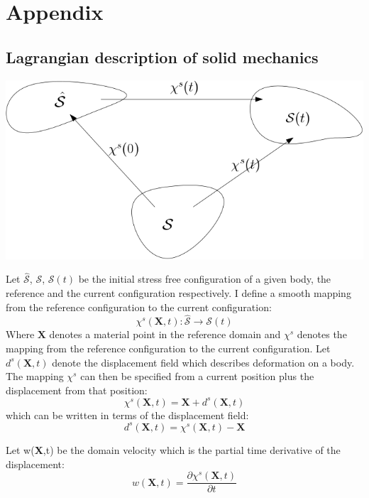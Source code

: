 \chapter{Appendix}
\section{Lagrangian description of solid mechanics}

\begin{center}
\includegraphics[scale=0.4]{continuum_mapping.png}
\end{center}
Let $ \hat{\mathcal{S}}$, $\mathcal{S}$, $\mathcal{S}(t)$ be the initial stress free configuration of a given body, the reference and the current configuration respectively.
I define a smooth mapping from the reference configuration to the current configuration:
\begin{equation}
\chi^s(\textbf{X},t) : \hat{\mathcal{S}} \rightarrow \mathcal{S}(t)     
\end{equation}
Where $\textbf{X}$ denotes a material point in the reference domain and $\chi^s$ denotes the mapping from the reference configuration to the current configuration. Let $d^s(\textbf{X},t)$ denote the displacement field which describes deformation on a body. The mapping $\chi^s$ can then be specified from a current position plus the displacement from that position:
\begin{equation} \label{eq:chi}
 \chi^s(\textbf{X},t) = \textbf{X}  + d^s(\textbf{X} ,t) 
\end{equation}
which can be written in terms of the displacement field:
\begin{equation}
 d^s(\textbf{X},t) = \chi^s(\textbf{X},t) -\textbf{X}   
\end{equation}

Let w(\textbf{X},t) be the domain velocity which is the partial time derivative of the displacement: 
\begin{equation}
 w(\textbf{X},t) = \frac{\partial \chi^s(\textbf{X},t)}{\partial t}   
\end{equation}

